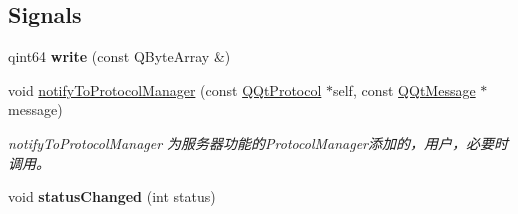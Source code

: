 \subsection*{Signals}
\begin{DoxyCompactItemize}
\item 
\mbox{\label{class_q_qt_protocol_ac1c3f7a556fff1a4e3bf4991044feea9}} 
qint64 {\bfseries write} (const Q\+Byte\+Array \&)
\item 
void \mbox{\hyperlink{class_q_qt_protocol_a95af0a9e22be37f68d953449e2c8e21d}{notify\+To\+Protocol\+Manager}} (const \mbox{\hyperlink{class_q_qt_protocol}{Q\+Qt\+Protocol}} $\ast$self, const \mbox{\hyperlink{class_q_qt_message}{Q\+Qt\+Message}} $\ast$message)
\begin{DoxyCompactList}\small\item\em notify\+To\+Protocol\+Manager 为服务器功能的\+Protocol\+Manager添加的，用户，必要时调用。 \end{DoxyCompactList}\item 
\mbox{\label{class_q_qt_protocol_aeb2a225e9d78439ea987fe9c1db667ce}} 
void {\bfseries status\+Changed} (int status)
\end{DoxyCompactItemize}
